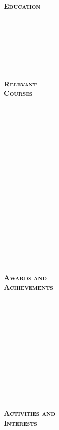 \documentclass[11pt]{article}
\begin{document}
\begin{minipage}[t]{0.2\linewidth} 
	\textbf{\textsc{
	\hspace{-5pt}Education \\ \\ \\ \\ \\ \\ \\ \\
	Relevant \\ Courses \\ \\ \\ \\ \\ \\ \\ \\ \\ \\ \\ \\ \\ \\ \\ \\ \\ \\ \\ 
	Awards and \\ Achievements \\ \\ \\ \\ \\ \\ \\ \\ \\ \\ \\ \\ \\
	Activities and\\ Interests
	}}
\end{minipage}
\end{document}

